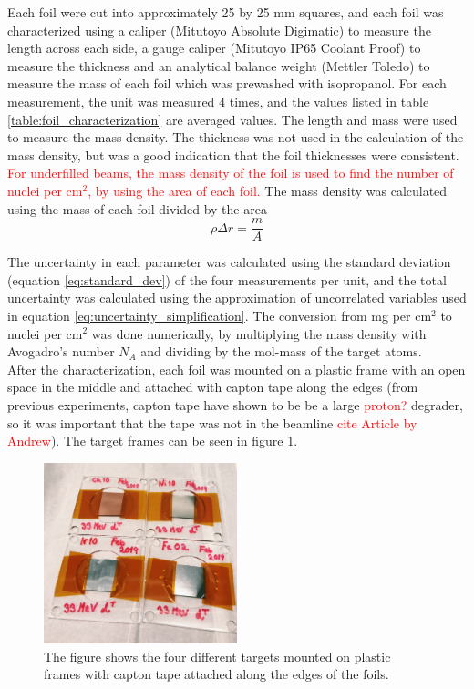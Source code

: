 \noindent 
Each foil were cut into approximately 25 by 25 mm squares, and each foil was characterized using a caliper (Mitutoyo Absolute Digimatic) to measure the length across each side, a gauge caliper (Mitutoyo IP65 Coolant Proof) to measure the thickness and an analytical balance weight (Mettler Toledo) to measure the mass of each foil which was prewashed with isopropanol. For each measurement, the unit was measured 4 times, and the values listed in table \ref{table:foil_characterization} are averaged values. The length and mass were used to measure the mass density. The thickness was not used in the
calculation of the mass density, but was a good indication that the foil thicknesses were consistent.
\textcolor{red}{For underfilled beams, the mass density of the foil is used to find the number of nuclei per cm$^2$, by using the area of each foil.} The mass density was calculated using the mass of each foil divided by the area
\begin{equation}
    \rho \Delta r = \frac{m}{A}
\end{equation}

\noindent 
The uncertainty in each parameter was calculated using the standard deviation (equation \ref{eq:standard_dev}) of the four measurements per unit, and the total uncertainty was calculated using the approximation of uncorrelated variables used in equation \ref{eq:uncertainty_simplification}. The conversion from mg per cm$^2$ to nuclei per cm$^2$ was done numerically, by multiplying the mass density with Avogadro's number $N_A$ and dividing by the mol-mass of the target atoms. \\

\noindent 
After the characterization, each foil was mounted on a plastic frame with an open space in the middle and attached with capton tape along the edges (from previous experiments, capton tape have shown to be be a large \textcolor{red}{proton?} degrader, so it was important that the tape was not in the beamline \textcolor{red}{cite Article by Andrew}). The target frames can be seen in figure \ref{fig:targets_on_frame}. 

\begin{figure}
    \centering
    \includegraphics[width=0.5\textwidth]{Experiment/targets_on_frame.JPG}
    \caption{The figure shows the four different targets mounted on plastic frames with capton tape attached along the edges of the foils.}
    \label{fig:targets_on_frame}
\end{figure}



